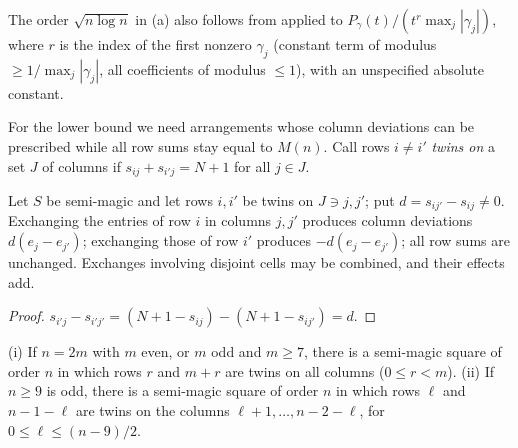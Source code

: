The order $\sqrt{n\log n}$ in (a) also follows from \cite[Theorem~2.1]{BEK1999} applied to $P_\gamma(t)/(t^{r}\max_j|\gamma_j|)$,
where $r$ is the index of the first nonzero $\gamma_j$ (constant term of modulus $\ge 1/\max_j|\gamma_j|$, all coefficients of
modulus $\le1$), with an unspecified absolute constant.

For the lower bound we need arrangements whose column deviations can be prescribed while all row sums stay equal to $M(n)$.
Call rows $i\ne i'$ \emph{twins on} a set $J$ of columns if $s_{ij}+s_{i'j}=N+1$ for all $j\in J$.

\begin{lemma}
\label{lem:twin}
Let $S$ be semi-magic and let rows $i,i'$ be twins on $J\ni j,j'$; put $d=s_{ij'}-s_{ij}\ne0$.  Exchanging the entries of row $i$ in
columns $j,j'$ produces column deviations $d(e_j-e_{j'})$; exchanging those of row $i'$ produces $-d(e_j-e_{j'})$; all row sums are
unchanged.  Exchanges involving disjoint cells may be combined, and their effects add.
\end{lemma}

\begin{proof}
$s_{i'j}-s_{i'j'}=(N+1-s_{ij})-(N+1-s_{ij'})=d$.
\end{proof}

\begin{lemma}
\label{lem:twin_squares}
(i) If $n=2m$ with $m$ even, or $m$ odd and $m\ge7$, there is a semi-magic square of order $n$ in which rows $r$ and $m+r$ are twins on
all columns ($0\le r<m$).
(ii) If $n\ge9$ is odd, there is a semi-magic square of order $n$ in which rows $\ell$ and $n-1-\ell$ are twins on the columns
$\ell+1,\dots,n-2-\ell$, for $0\le\ell\le(n-9)/2$.
\end{lemma}


